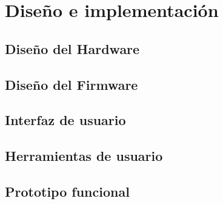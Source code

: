\chapter{Diseño e implementación} %

\label{Chapter3} %

\section{Diseño del Hardware}

\section{Diseño del Firmware}

\section{Interfaz de usuario}

\section{Herramientas de usuario}

\section{Prototipo funcional}
